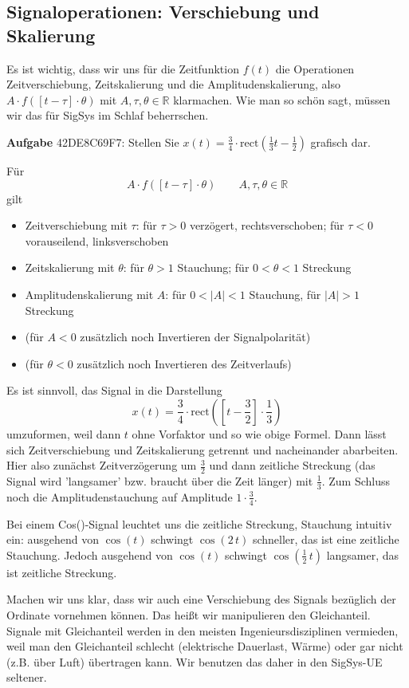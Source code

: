 \subsection{Signaloperationen: Verschiebung und Skalierung}
\label{sec:42DE8C69F7}
\begin{Ziel}
Es ist wichtig, dass wir uns für die Zeitfunktion $f(t)$
die Operationen
Zeitverschiebung,
Zeitskalierung und die Amplitudenskalierung, also
$A \cdot f(\left[t-\tau\right]\cdot \theta)$ mit $A,\tau,\theta\in\mathbb{R}$
klarmachen.
%
Wie man so schön sagt, müssen wir das für SigSys im Schlaf beherrschen.
\end{Ziel}
\textbf{Aufgabe} {\tiny 42DE8C69F7}: Stellen Sie
{$x(t) = \frac{3}{4} \cdot \mathrm{rect}(\frac{1}{3} t-\frac{1}{2})$}
grafisch dar.
\begin{Werkzeug}
Für
\begin{equation}
A \cdot f(\left[t-\tau\right]\cdot \theta)  \qquad A,\tau,\theta\in\mathbb{R}
\end{equation}
gilt
\begin{itemize}
  \item Zeitverschiebung mit
  $\tau$: für $\tau>0$ verzögert, rechtsverschoben; für $\tau<0$ vorauseilend, linksverschoben
  \item Zeitskalierung mit $\theta$: für $\theta>1$ Stauchung; für $0<\theta<1$ Streckung
  \item Amplitudenskalierung mit $A$: für $0<|A|<1$ Stauchung, für $|A|>1$ Streckung
  \item (für $A<0$ zusätzlich noch Invertieren der Signalpolarität)
  \item (für $\theta<0$ zusätzlich noch Invertieren des Zeitverlaufs)
\end{itemize}
\end{Werkzeug}
\begin{Ansatz}
Es ist sinnvoll, das Signal in die Darstellung
\begin{equation}
x(t) = \frac{3}{4} \cdot \mathrm{rect}(\left[t-\frac{3}{2}\right]\cdot \frac{1}{3})
\end{equation}
umzuformen, weil dann $t$ ohne Vorfaktor und so wie obige Formel.
Dann lässt sich Zeitverschiebung und Zeitskalierung
getrennt und nacheinander abarbeiten. Hier also zunächst Zeitverzögerung um
$\frac{3}{2}$ und dann zeitliche Streckung (das Signal wird 'langsamer' bzw.
braucht über die Zeit länger) mit $\frac{1}{3}$.
%
Zum Schluss noch die Amplitudenstauchung auf Amplitude $1 \cdot \frac{3}{4}$.

Bei einem Cos()-Signal leuchtet uns die zeitliche Streckung, Stauchung intuitiv
ein: ausgehend von $\cos(t)$ schwingt $\cos(2\,t)$ schneller, das ist eine
zeitliche Stauchung. Jedoch ausgehend von $\cos(t)$ schwingt $\cos(\frac{1}{2}\,t)$
langsamer, das ist zeitliche Streckung.

Machen wir uns klar, dass wir auch eine Verschiebung des Signals bezüglich der
Ordinate vornehmen können. Das heißt wir manipulieren den Gleichanteil.
%
Signale mit Gleichanteil werden in den meisten Ingenieursdisziplinen vermieden,
weil man den Gleichanteil schlecht (elektrische Dauerlast, Wärme)
oder gar nicht (z.B. über Luft) übertragen kann. Wir benutzen das daher in den
SigSys-UE seltener.

\end{Ansatz}
